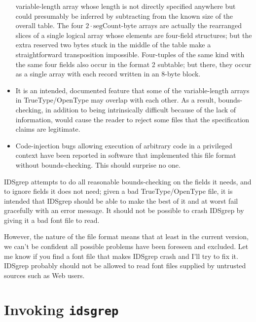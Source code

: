\documentclass[twocolumn]{report}
\begin{document}
\begin{itemize}
    variable-length array whose length is not directly specified
    anywhere but could presumably be inferred by subtracting from the
    known size of the overall table. The four $2 \cdot
    \textrm{segCount}$-byte arrays are actually the rearranged slices
    of a single logical array whose elements are four-field
    structures; but the extra reserved two bytes
    stuck in the middle of the table make a straightforward transposition
    impossible.  Four-tuples of the same kind with the same four fields
    also occur in the format 2 subtable; but there, they occur as a single
    array with each record written in an 8-byte block.
  \item It is an intended, documented feature that some of the
    variable-length arrays in TrueType/OpenType may overlap with each other. 
    As a result, bounds-checking, in addition to being intrinsically
    difficult because of the lack of information, would cause the
    reader to reject some files that the specification claims are
    legitimate.
  \item Code-injection bugs allowing execution of arbitrary
    code in a privileged context have been reported in software
    that implemented this file format without bounds-checking.  This should
    surprise no one.
\end{itemize}

IDSgrep attempts to do all reasonable bounds-checking on the fields it
needs, and to ignore fields it does not need; given a bad TrueType/OpenType
file, it is intended that IDSgrep should be able to make the best of it and
at worst fail gracefully with an error message.  It should not be possible
to crash IDSgrep by giving it a bad font file to read.

However, the nature of the file format means that at least in the
current version, we can't be confident all possible problems have
been foreseen and excluded.  Let me know if you find a font file that
makes IDSgrep crash and I'll try to fix it. IDSgrep probably should not be
allowed to read font files supplied by untrusted sources such as Web
users.


\chapter{Invoking \texttt{idsgrep}}
\end{document}
